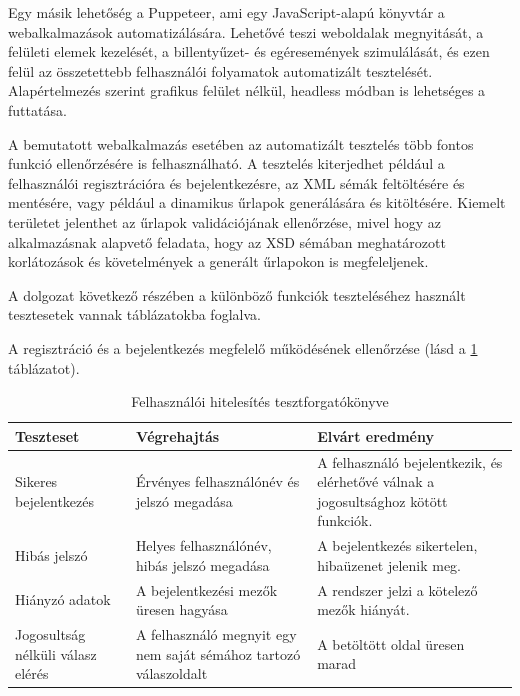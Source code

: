 Egy másik lehetőség a Puppeteer\cite{puppeteer}, ami egy JavaScript-alapú könyvtár a webalkalmazások automatizálására. Lehetővé teszi weboldalak megnyitását, a felületi elemek kezelését, a billentyűzet- és egéresemények szimulálását, és ezen felül az összetettebb felhasználói folyamatok automatizált tesztelését. Alapértelmezés szerint grafikus felület nélkül, headless módban is lehetséges a futtatása.

A bemutatott webalkalmazás esetében az automatizált tesztelés több fontos funkció ellenőrzésére is felhasználható. A tesztelés kiterjedhet például a felhasználói regisztrációra és bejelentkezésre, az XML sémák feltöltésére és mentésére, vagy például a dinamikus űrlapok generálására és kitöltésére. Kiemelt területet jelenthet az űrlapok validációjának ellenőrzése, mivel hogy az alkalmazásnak alapvető feladata, hogy az XSD sémában meghatározott korlátozások és követelmények a generált űrlapokon is megfeleljenek.


A dolgozat következő részében a különböző funkciók teszteléséhez használt tesztesetek vannak táblázatokba foglalva.

A regisztráció és a bejelentkezés megfelelő működésének ellenőrzése (lásd a \ref{tab:tesztf1} táblázatot).
\begin{table}[h]
\centering
\caption{Felhasználói hitelesítés tesztforgatókönyve}
\label{tab:tesztf1}
\begin{tabular}{|p{}|p{}|p{}|}
\hline
Teszteset & Végrehajtás & Elvárt eredmény \\
\hline
Sikeres bejelentkezés & Érvényes felhasználónév és jelszó megadása & A felhasználó bejelentkezik, és elérhetővé válnak a jogosultsághoz kötött funkciók. \\
\hline
Hibás jelszó & Helyes felhasználónév, hibás jelszó megadása & A bejelentkezés sikertelen, hibaüzenet jelenik meg. \\
\hline
Hiányzó adatok & A bejelentkezési mezők üresen hagyása & A rendszer jelzi a kötelező mezők hiányát. \\
\hline
Jogosultság nélküli válasz elérés & A felhasználó megnyit egy nem saját sémához tartozó válaszoldalt & A betöltött oldal üresen marad \\
\hline
\end{tabular}
\end{table}

